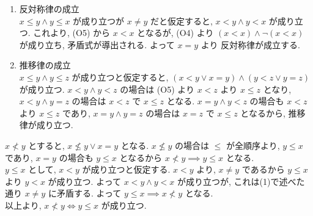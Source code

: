 \begin{nmprob}
{\begin{enumerate}
$x = x$ が常に成立ことから, $x < x \lor x = x$ も常に成立する. よって, 反射律が成立する.
\item 反対称律の成立\\
$x \leq y \land y \leq x$ が成り立つが $x \neq y$ だと仮定すると, $x < y \land y < x$ が成り立つ. これより, (O5) から $x < x$ となるが, (O4) より $(x < x) \land \lnot(x < x)$ が成り立ち, 矛盾式が導出される. よって $x = y$ より 反対称律が成立する.
\item 推移律の成立\\
$x \leq y \land y \leq z$ が成り立つと仮定すると, $(x < y \lor x = y) \land (y < z \lor y = z)$ が成り立つ. $x < y \land y < z$ の場合は (O5) より $x < z$ より $x \leq z$ となり,
$x < y \land y = z$ の場合は $x < z$ で $x \leq z$ となる. $x = y \land y < z$ の場合も $x < z$ より $x \leq z$ であり, $x = y \land y = z$ の場合は $x = z$ で $x \leq z$ となるから, 推移律が成り立つ.
\end{enumerate}
\item $x \nless y$ とすると, $x \nleq y \lor x = y$ となる. $x \nleq y$ の場合は $\leq$ が全順序より, $y \leq x$ であり, $x = y$ の場合も $y \leq x$ となるから $x \nless y \implies y \leq x$ となる.\\
$y \leq x$ として, $x < y$ が成り立つと仮定する. $x < y$ より, $x \neq y$ であるから $y \leq x$ より $y < x$ が成り立つ. よって $x < y \land y < x$ が成り立つが, これは(1)で述べた通り $x \neq y$ に矛盾する. よって $y \leq x \implies x \nless y$ となる.\\
以上より, $x \nless y \iff y \leq x$ が成り立つ.
}
\makeatletter\tagsleft@false\makeatother
\end{nmprob}



